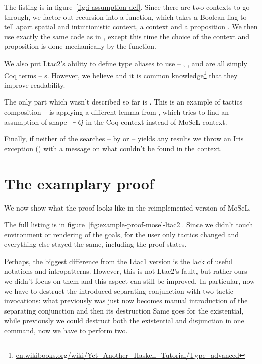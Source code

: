 The listing is in figure~\ref{fig:i-assumption-def}.
Since there are two contexts to go through, we factor out recursion into a  function, which takes a Boolean flag  to tell apart spatial and intuitionistic context, a context  and a proposition .
We then use exactly the same code as in , except this time the choice of the context and proposition is done mechanically by the  function.

We also put Ltac2's ability to define type aliases to use -- , , and  are all simply Coq terms -- s.
However, we believe and it is common knowledge\footnote{\href{https://en.wikibooks.org/wiki/Yet\_Another\_Haskell\_Tutorial/Type\_advanced}{en.wikibooks.org/wiki/Yet\_Another\_Haskell\_Tutorial/Type\_advanced}} that they improve readability.

The only part which wasn't described so far is .
This is an example of tactics composition --  is applying a different lemma from , which tries to find an assumption of shape \(\Vdash Q\) in the Coq context instead of MoSeL context.

Finally, if neither of the searches -- by  or  -- yields any results we throw an Iris exception () with a message on what couldn't be found in the context.

\section{The examplary proof}
\label{sec:examplary-proof-in-ltac2-mosel}

We now show what the proof looks like in the reimplemented version of MoSeL.

The full listing is in figure~\ref{fig:example-proof-mosel-ltac2}.
Since we didn't touch environment or rendering of the goals, for the user only tactics changed and everything else stayed the same, including the proof states.

Perhaps, the biggest difference from the Ltac1 version is the lack of useful notations and intropatterns.
However, this is not Ltac2's fault, but rather ours -- we didn't focus on them and this aspect can still be improved.
In particular, now we have to destruct the introduced separating conjunction with two tactic invocations: what previously was just  now becomes manual introduction of the separating conjunction  and then its destruction 
Same goes for the existential, while previously we could destruct both the existential and disjunction in one command, now we have to perform two.

